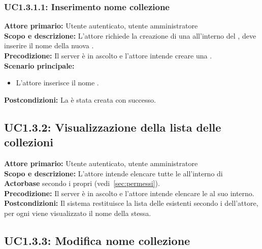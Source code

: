 \documentclass{scalatekids-article}
\begin{document}
\subsubsection{UC1.3.1.1: Inserimento nome collezione}

\textbf{Attore primario:} Utente autenticato, utente amministratore\\
\textbf{Scopo e descrizione:} L'attore richiede la creazione di una  all'interno del , deve inserire il nome della nuova .\\
\textbf{Precodizione:} Il server è in ascolto e l'attore intende creare una .\\
\textbf{Scenario principale:}
\begin{itemize}
\item L'attore inserisce il nome .
\end{itemize}
\textbf{Postcondizioni:} La  è stata creata con successo.

\subsection{UC1.3.2: Visualizzazione della lista delle collezioni}

\textbf{Attore primario:} Utente autenticato, utente amministratore\\
\textbf{Scopo e descrizione:} L'attore intende elencare tutte le  all'interno di \textbf{Actorbase} secondo i propri  (vedi~\ref{sec:permessi}).\\
\textbf{Precodizione:} Il server è in ascolto e l'attore intende elencare le  al suo interno.\\
\textbf{Postcondizioni:} Il sistema restituisce la lista delle  esistenti secondo i  dell'attore, per ogni  viene visualizzato il nome della  stessa.

\subsection{UC1.3.3: Modifica nome collezione}
\end{document}
